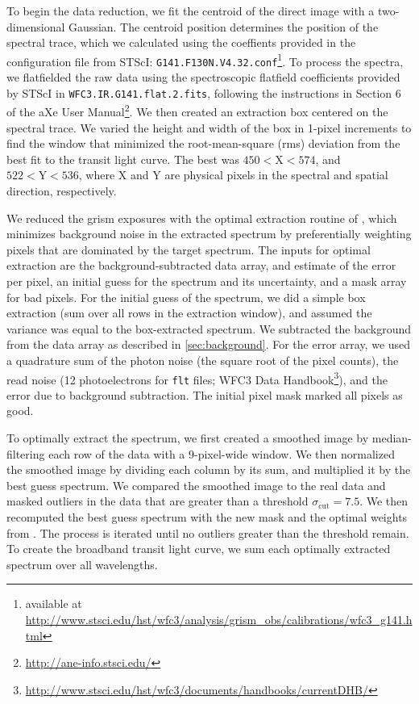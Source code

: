\documentclass[twocolumn,trackchanges]{aastex62}
\begin{document}
To begin the data reduction, we fit the centroid of the direct image with a two-dimensional Gaussian. The centroid position determines the position of the spectral trace, which we calculated using the coeffients provided in the configuration file from STScI: \texttt{G141.F130N.V4.32.conf}\footnote{available at \url{http://www.stsci.edu/hst/wfc3/analysis/grism_obs/calibrations/wfc3_g141.html}}.  To process the spectra, we flatfielded the raw data using the spectroscopic flatfield coefficients provided by STScI in \texttt{WFC3.IR.G141.flat.2.fits}, following the instructions in Section 6 of the aXe User Manual\footnote{\url{http://ane-info.stsci.edu/}}.  We then created an extraction box centered on the spectral trace. We varied the height and width of the box in 1-pixel increments to find the window that minimized the root-mean-square (rms) deviation from the best fit to the transit light curve.  The best was $450  < \mathrm{X} < 574$, and $522 < \mathrm{Y} < 536$, where X and Y are physical pixels in the spectral and spatial direction, respectively. 

We reduced the grism exposures with the optimal extraction routine of \cite{horne86}, which minimizes background noise in the extracted spectrum by preferentially weighting pixels that are dominated by the target spectrum.  The inputs for optimal extraction are the background-subtracted data array, and estimate of the error per pixel, an initial guess for the spectrum and its uncertainty, and a mask array for bad pixels.  For the initial guess of the spectrum, we did a simple box extraction (sum over all rows in the extraction window), and assumed the variance was equal to the box-extracted spectrum.  We subtracted the background from the data array as described in \ref{sec:background}. For the error array, we used a quadrature sum of the photon noise (the square root of the pixel counts), the read noise (12 photoelectrons for \texttt{flt} files; WFC3 Data Handbook\footnote{\url{http://www.stsci.edu/hst/wfc3/documents/handbooks/currentDHB/}}), and the error due to background subtraction. The initial pixel mask marked all pixels as good. 

To optimally extract the spectrum,  we first created a smoothed image by median-filtering each row of the data with a 9-pixel-wide window.  We then normalized the smoothed image by dividing each column by its sum, and multiplied it by the best guess spectrum. We compared the smoothed image to the real data and masked outliers in the data that are greater than a threshold $\sigma_\mathrm{cut} = 7.5$. We then recomputed the best guess spectrum with the new mask and the optimal weights from \cite{horne86}. The process is iterated until no outliers greater than the threshold remain.  To create the broadband transit light curve, we sum each optimally extracted spectrum over all wavelengths. 
\end{document}
